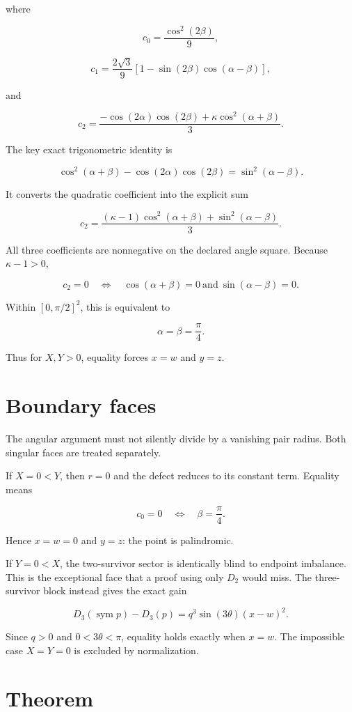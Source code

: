 \documentclass[11pt,a4paper,openany]{report}
\begin{document}
where

\[
c_0=\frac{\cos^2(2\beta)}9,
\]

\[
c_1=\frac{2\sqrt3}{9}
\left[1-\sin(2\beta)\cos(\alpha-\beta)\right],
\]

and

\[
c_2=
\frac{-\cos(2\alpha)\cos(2\beta)
+\kappa\cos^2(\alpha+\beta)}3.
\]

The key exact trigonometric identity is

\[
\cos^2(\alpha+\beta)-
\cos(2\alpha)\cos(2\beta)
=\sin^2(\alpha-\beta).
\]

It converts the quadratic coefficient into the explicit sum

\[
\boxed{
c_2=\frac{(\kappa-1)\cos^2(\alpha+\beta)
+\sin^2(\alpha-\beta)}3.}
\]

All three coefficients are nonnegative on the declared angle square. Because \(\kappa-1>0\),

\[
c_2=0
\quad\Longleftrightarrow\quad
\cos(\alpha+\beta)=0
\ \text{and}\ 
\sin(\alpha-\beta)=0.
\]

Within \([0,\pi/2]^2\), this is equivalent to

\[
\alpha=\beta=\frac\pi4.
\]

Thus for \(X,Y>0\), equality forces \(x=w\) and \(y=z\).

\section{Boundary faces}

The angular argument must not silently divide by a vanishing pair radius. Both singular faces are treated separately.

If \(X=0<Y\), then \(r=0\) and the defect reduces to its constant term. Equality means

\[
c_0=0\quad\Longleftrightarrow\quad\beta=\frac\pi4.
\]

Hence \(x=w=0\) and \(y=z\): the point is palindromic.

If \(Y=0<X\), the two-survivor sector is identically blind to endpoint imbalance. This is the exceptional face that a proof using only \(D_2\) would miss. The three-survivor block instead gives the exact gain

\[
D_3(\operatorname{sym}p)-D_3(p)
=q^3\sin(3\theta)(x-w)^2.
\]

Since \(q>0\) and \(0<3\theta<\pi\), equality holds exactly when \(x=w\). The impossible case \(X=Y=0\) is excluded by normalization.

\section{Theorem}
\end{document}
